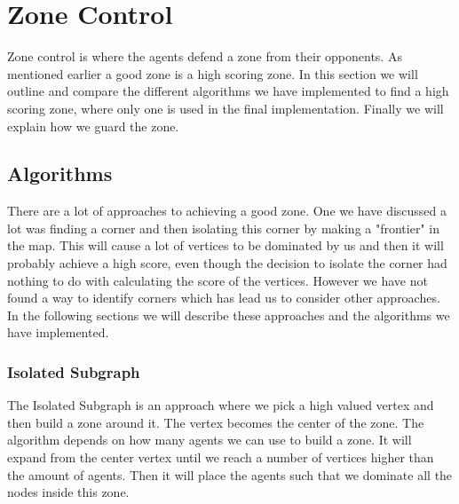 \documentclass[11pt]{article}
\begin{document}
\section{Zone Control}
Zone control is where the agents defend a zone from their opponents. As mentioned earlier a good zone is a high scoring zone. In this section we will outline and compare the different algorithms we have implemented to find a high scoring zone, where only one is used in the final implementation. Finally we will explain how we guard the zone.

\subsection{Algorithms}
There are a lot of approaches to achieving a good zone. One we have discussed a lot was finding a corner and then isolating this corner by making a "frontier" in the map. This will cause a lot of vertices to be dominated by us and then it will probably achieve a high score, even though the decision to isolate the corner had nothing to do with calculating the score of the vertices. However we have not found a way to identify corners which has lead us to consider other approaches. In the following sections we will describe these approaches and the algorithms we have implemented.

\subsubsection{Isolated Subgraph}
The Isolated Subgraph is an approach where we pick a high valued vertex and then build a zone around it. The vertex becomes the center of the zone. The algorithm depends on how many agents we can use to build a zone. It will expand from the center vertex until we reach a number of vertices higher than the amount of agents. Then it will place the agents such that we dominate all the nodes inside this zone.
\end{document}
